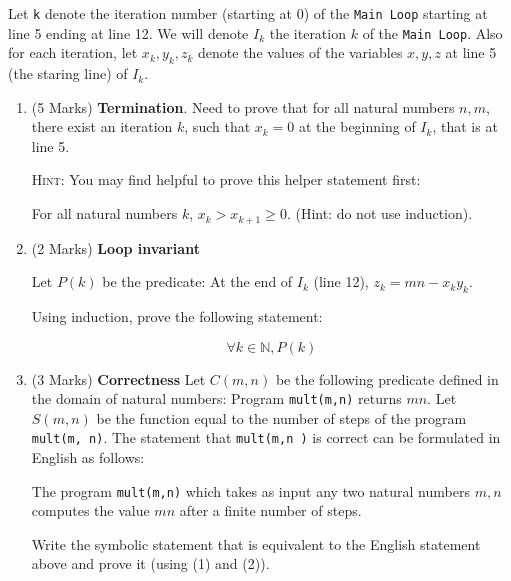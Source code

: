 \documentclass[12pt]{article}
\begin{document}
Let \verb|k| denote the iteration number (starting at 0) of the \verb|Main Loop| 
starting at line 5 ending at line 12. We will denote $I_k$ the
iteration $k$ of the \verb|Main Loop|.  Also for each iteration,  let $x_k,
y_k, z_k$ denote the values of the variables $x,y,z$ at line 5 (the staring
line) of $I_k$.


\begin{enumerate}

\item {(5 Marks)} \textbf{Termination}. Need to prove that for all natural numbers $n, m$, there exist an iteration $k$, such that $x_k=0$ at the beginning of $I_k$, that is at line 5.


\textsc{Hint:} You may find helpful to prove this helper statement first:


For all natural numbers $k$, $x_k > x_{k+1}\geq 0$. (Hint: do not use induction).


\item {(2 Marks)} \textbf{Loop invariant}


Let $P(k)$ be the predicate: At the end of $I_k$ (line 12), $z_k = mn-x_ky_k$.

Using induction, prove the following statement:

$$\forall k\in \mathbb{N}, P(k)$$

\item {(3 Marks)} \textbf{Correctness} Let $C(m, n)$ be the following predicate defined in the domain of natural numbers: Program \verb|mult(m,n)| returns $mn$. Let $S(m, n)$ be the function equal to the number of steps of the program \verb|mult(m, n)|. The statement that \verb|mult(m,n )| is correct can be formulated in English as follows:

The program \verb|mult(m,n)| which takes as input any two natural numbers $m,n$ computes the value $mn$ after a finite number of steps.

Write the symbolic statement that is equivalent to the English statement above and prove it (using (1) and (2)).
 
\end{enumerate}
\end{document}
